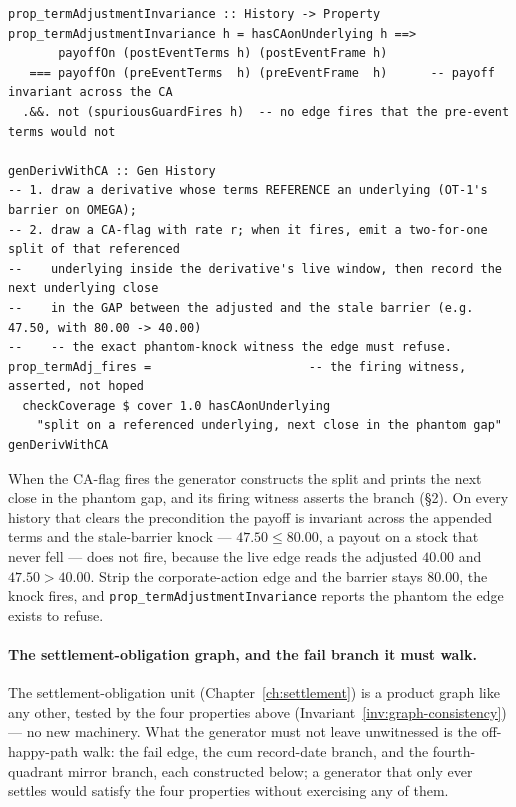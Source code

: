 \documentclass[11pt,a4paper]{article}
\begin{document}
\begin{lstlisting}
prop_termAdjustmentInvariance :: History -> Property
prop_termAdjustmentInvariance h = hasCAonUnderlying h ==>
       payoffOn (postEventTerms h) (postEventFrame h)
   === payoffOn (preEventTerms  h) (preEventFrame  h)      -- payoff invariant across the CA
  .&&. not (spuriousGuardFires h)  -- no edge fires that the pre-event terms would not

genDerivWithCA :: Gen History
-- 1. draw a derivative whose terms REFERENCE an underlying (OT-1's barrier on OMEGA);
-- 2. draw a CA-flag with rate r; when it fires, emit a two-for-one split of that referenced
--    underlying inside the derivative's live window, then record the next underlying close
--    in the GAP between the adjusted and the stale barrier (e.g. 47.50, with 80.00 -> 40.00)
--    -- the exact phantom-knock witness the edge must refuse.
prop_termAdj_fires =                      -- the firing witness, asserted, not hoped
  checkCoverage $ cover 1.0 hasCAonUnderlying
    "split on a referenced underlying, next close in the phantom gap" genDerivWithCA
\end{lstlisting}

When the CA-flag fires the generator constructs the split and prints the next close in the
phantom gap, and its firing witness asserts the branch (\S 2). On every history that clears
the precondition the payoff is invariant across the appended terms and the stale-barrier
knock --- $47.50 \le 80.00$, a payout on a stock that never fell --- does not fire, because
the live edge reads the adjusted $40.00$ and $47.50 > 40.00$. Strip the corporate-action edge
and the barrier stays $80.00$, the knock fires, and \texttt{prop\_termAdjustmentInvariance}
reports the phantom the edge exists to refuse.

\paragraph{The settlement-obligation graph, and the fail branch it must walk.} The
settlement-obligation unit (Chapter~\ref{ch:settlement}) is a product graph like any
other, tested by the four properties above (Invariant~\ref{inv:graph-consistency}) --- no
new machinery. What the generator must not leave unwitnessed is the off-happy-path walk:
the fail edge, the cum record-date branch, and the fourth-quadrant mirror branch, each
constructed below; a generator that only ever settles would satisfy the four properties
without exercising any of them.
\end{document}
